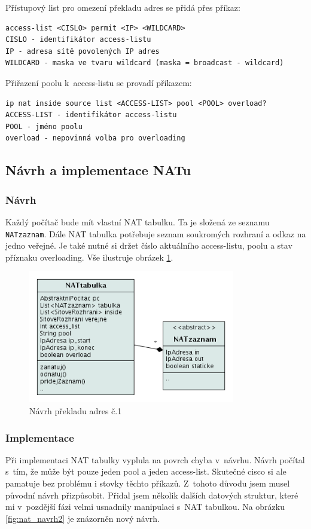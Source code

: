Přístupový list pro omezení překladu adres se přidá přes příkaz:
\begin{verbatim}
access-list <CISLO> permit <IP> <WILDCARD>
CISLO - identifikátor access-listu
IP - adresa sítě povolených IP adres
WILDCARD - maska ve tvaru wildcard (maska = broadcast - wildcard)
\end{verbatim}

Přiřazení poolu k~access-listu se provadí příkazem:
\begin{verbatim}
ip nat inside source list <ACCESS-LIST> pool <POOL> overload?
ACCESS-LIST - identifikátor access-listu
POOL - jméno poolu
overload - nepovinná volba pro overloading
\end{verbatim} 


\subsection{Návrh a implementace NATu}

\subsubsection{Návrh}
Každý počítač bude mít vlastní NAT tabulku. Ta je složená ze seznamu \verb|NATzaznam|. Dále NAT tabulka potřebuje seznam soukromých rozhraní a odkaz na jedno veřejné. Je také nutné si držet číslo aktuálního access-listu, poolu a stav příznaku overloading. Vše ilustruje obrázek \ref{fig:nat_navrh1}.

\begin{figure}[h]
\begin{center}
\includegraphics[width=9cm]{figures/nat_navrh1}
\caption{Návrh překladu adres č.1}
\label{fig:nat_navrh1}
\end{center}
\end{figure}

\subsubsection{Implementace}
Při implementaci NAT tabulky vyplula na povrch chyba v~návrhu. Návrh počítal s~tím, že může být pouze jeden pool a jeden access-list. Skutečné cisco si ale pamatuje bez problému i stovky těchto příkazů. Z~tohoto důvodu jsem musel původní návrh přizpůsobit. Přidal jsem několik dalších datových struktur, které mi v~pozdější fázi velmi usnadnily manipulaci s~NAT tabulkou. Na obrázku \ref{fig:nat_navrh2} je znázorněn nový návrh.

